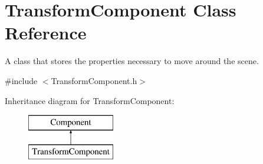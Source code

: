 \hypertarget{class_transform_component}{}\section{Transform\+Component Class Reference}
\label{class_transform_component}


A class that stores the properties necessary to move around the scene.  




{\ttfamily \#include $<$Transform\+Component.\+h$>$}

Inheritance diagram for Transform\+Component\+:\begin{figure}[H]
\begin{center}
\leavevmode
\includegraphics[height=2.000000cm]{class_transform_component}
\end{center}
\end{figure}
